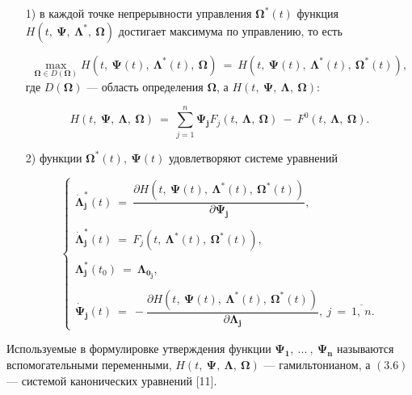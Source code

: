 \documentclass[14pt]{extreport}
\begin{document}
\begin{itemize}
\item[1)] в каждой точке непрерывности управления $\boldsymbol\Omega^*(t)$ функция $H(t,\ \boldsymbol\Psi,\ \boldsymbol\Lambda^*,\ \boldsymbol\Omega)$ достигает максимума по управлению, то есть

\begin{equation}
 \max_{\boldsymbol\Omega \in D(\boldsymbol\Omega)} H(t,\ \boldsymbol\Psi(t),\ \boldsymbol\Lambda^*(t),\ \boldsymbol\Omega)\
 =\ H(t,\ \boldsymbol\Psi(t),\ \boldsymbol\Lambda^*(t),\ \boldsymbol\Omega^*(t)),
\end{equation}
где $D(\boldsymbol\Omega)$ --- область определения $\boldsymbol\Omega$, а $H(t,\ \boldsymbol\Psi,\ \boldsymbol\Lambda,\ \boldsymbol\Omega):$

\begin{equation}
 H(t,\ \boldsymbol\Psi,\ \boldsymbol\Lambda,\ \boldsymbol\Omega)\ =\ \sum_{j=1}^n\boldsymbol{\Psi_{j}}F_{j}(t,\ \boldsymbol\Lambda,\ \boldsymbol\Omega)\ -\ F^0(t,\ \boldsymbol\Lambda,\ \boldsymbol\Omega).
\end{equation}

\item[2)] функции $\boldsymbol\Omega^*(t),\ \boldsymbol\Psi(t)$ удовлетворяют системе уравнений

\begin{equation}
\begin{cases}
\boldsymbol{\dot{\Lambda}^{*}_j}(t)\ =\ \dfrac{\partial H(t,\ \boldsymbol\Psi(t),\ \boldsymbol{\Lambda^*}(t),\
\boldsymbol{\Omega^*}(t))}{ \partial \boldsymbol{\Psi_j}},\ \\ \\
\boldsymbol{\dot{\Lambda}^{*}_j}(t)\ =\ F_j(t,\ \boldsymbol{\Lambda^*}(t),\ \boldsymbol{\Omega^*}(t)),\\ \\
\boldsymbol{\Lambda_j^*}(t_0)\ =\ \boldsymbol{\Lambda_{0_j}},\\ \\
\boldsymbol{\dot{\Psi}_j}(t)\ =\ -\dfrac{\partial H(t,\ \boldsymbol\Psi(t),\ \boldsymbol\Lambda^*(t),\ \boldsymbol{\Omega^*}(t))}
{\partial \boldsymbol{\Lambda_j}},\ j\ =\ \overline{1,\ n}.
 \end{cases}
\end{equation}

\end{itemize}

Используемые в формулировке утверждения функции $\boldsymbol{\Psi_1},\ ...\ ,\ \boldsymbol{\Psi_n}$ называются вспомогательными переменными,
$H(t,\ \boldsymbol\Psi,\ \boldsymbol\Lambda,\ \boldsymbol\Omega)$ --- гамильтонианом, а $(3.6)$ --- системой канонических уравнений [11].
\end{document}
